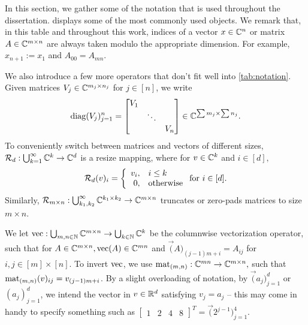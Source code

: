 In this section, we gather some of the notation that is used throughout the dissertation.   displays some of the most commonly used objects.  We remark that, in this table and throughout this work, indices of a vector $x \in \Cn$ or matrix $A \in \Cmxn$ are always taken modulo the appropriate dimension.  For example, $x_{n + 1} := x_1$ and $A_{00} = A_{mn}$.

We also introduce a few more operators that don't fit well into \cref{tab:notation}.  Given matrices $V_j \in \C^{m_j \times n_j}$ for $j \in [n]$, we write \[\diag(V_j)_{j = 1}^n = \begin{bmatrix} V_1 & & \\ & \ddots & \\ & & V_n \end{bmatrix} \in \C^{\sum m_j \times \sum n_j}.\]  To conveniently switch between matrices and vectors of different sizes, $\mathcal{R}_d : \bigcup_{k = 1}^\infty \C^k \to \C^d$ is a resize mapping, where for $v \in \C^k$ and $i \in [d],$ $$\mathcal{R}_d(v)_i = \left\{\begin{array}{r@{,\quad}l} v_i & i \le k \\ 0 & \text{otherwise} \end{array}\right. \text{for}\ i \in [d].$$  Similarly, $\mathcal{R}_{m \times n} : \bigcup_{k_1, k_2}^\infty \C^{k_1 \times k_2} \to \C^{m \times n}$ truncates or zero-pads matrices to size $m \times n$.  

We let $\vec : \bigcup_{m, n \in \N} \C^{m \times n} \to \bigcup_{k \in \N} \C^k$ be the columnwise vectorization operator, such that for $A \in \C^{m \times n}, \vec(A) \in \C^{m n}$ and  $\vec(A)_{(j - 1) m + i} = A_{i j}$ for $i, j \in [m] \times [n]$.  To invert $\vec$, we use $\mat_{(m, n)} : \C^{m n} \to \C^{m \times n},$ such that $\mat_{(m, n)}(v)_{ij} = v_{(j - 1) m + i}$.  By a slight overloading of notation, by $\vec(a_j)_{j = 1}^d$ or $(a_j)_{j=1}^d$, we intend the vector in $v \in \R^d$ satisfying $v_j = a_j$ -- this may come in handy to specify something such as $\begin{bmatrix} 1 & 2 & 4 & 8 \end{bmatrix}^T = \vec(2^{j - 1})_{j = 1}^4$.

{\pagebreak\newcommand{\env}[1]{\texttt{#1}}\renewcommand{\thefootnote}{\fnsymbol{footnote}}
  \centering \renewcommand{\arraystretch}{1.5}
}

{\renewcommand{\thefootnote}{\fnsymbol{footnote}}}
